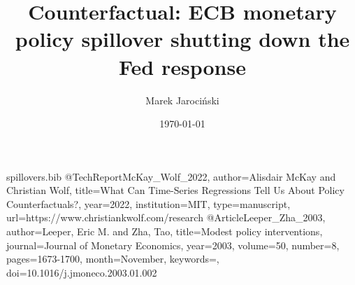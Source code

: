 \begin{filecontents}{spillovers.bib}
@TechReport{McKay_Wolf_2022,
  author={Alisdair McKay and Christian Wolf},
  title={What Can Time-Series Regressions Tell Us About Policy Counterfactuals?},
  year=2022,
  institution={MIT},
  type={manuscript},
  url={https://www.christiankwolf.com/research}
}
@Article{Leeper_Zha_2003,
  author={Leeper, Eric M. and Zha, Tao},
  title={{Modest policy interventions}},
  journal={Journal of Monetary Economics},
  year=2003,
  volume={50},
  number={8},
  pages={1673-1700},
  month={November},
  keywords={},
  doi={10.1016/j.jmoneco.2003.01.002}
}



\end{filecontents}

\documentclass[a4paper,12pt]{article}
\usepackage{amsfonts}
\usepackage{amsmath}
\usepackage{graphicx}
\usepackage{amssymb}
\usepackage{array}
\usepackage[round]{natbib}
\usepackage{booktabs}
\usepackage{floatpag}
\usepackage[hmargin=2.5cm,vmargin=3cm]{geometry}
\usepackage{setspace}
\usepackage{chngcntr}
\usepackage{verbatim}
\usepackage{multirow}
\usepackage{url}
\usepackage{doi}
\usepackage{hyperref}
\usepackage{xcolor}

\usepackage[gen]{eurosym}
\renewcommand{\floatpagefraction}{0.95}
\newcommand{\pathTables}{../workm_lp/}
\newcommand{\pathFigures}{}
\newcommand{\pathA}{}
\newcommand{\pathB}{}
\newcommand{\pathC}{}


\author{Marek Jaroci\'nski}
\date{\today}
\title{Counterfactual: ECB monetary policy spillover shutting down the Fed response}
\maketitle




This section reports the counterfactual effect of an ECB monetary policy shock on the US
in the scenario in which the Fed monetary policy does not respond to offset the shock.
This exercise, taken at face value, would suggest that in the absence of the Fed offsetting policy,
the ECB monetary policy shocks would spill over across the Atlantic as strongly as the Fed monetary policy shocks do.

